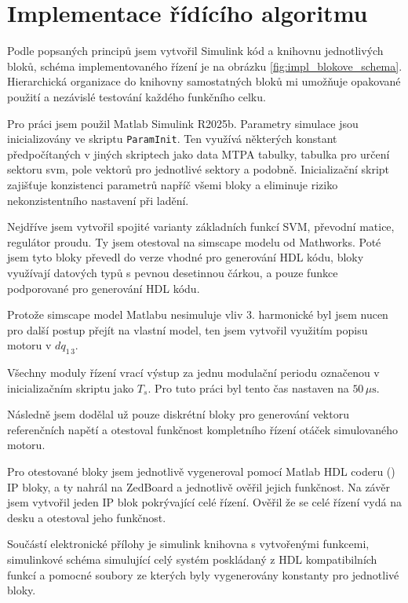 
\chapter{Implementace řídícího algoritmu}
Podle popsaných principů jsem vytvořil Simulink kód a knihovnu jednotlivých bloků, schéma implementovaného řízení je na obrázku \ref{fig:impl_blokove_schema}. Hierarchická organizace do knihovny samostatných bloků mi umožňuje opakované použití a nezávislé testování každého funkčního celku.



Pro práci jsem použil Matlab Simulink R2025b. Parametry simulace jsou inicializovány ve skriptu \texttt{ParamInit}. Ten využívá některých konstant předpočítaných v jiných skriptech jako  data MTPA tabulky, tabulka pro určení sektoru svm, pole vektorů pro jednotlivé sektory a podobně. Inicializační skript zajišťuje konzistenci parametrů napříč všemi bloky a eliminuje riziko nekonzistentního nastavení při ladění.

Nejdříve jsem vytvořil spojité varianty základních funkcí SVM, převodní matice, regulátor proudu. Ty jsem otestoval na simscape modelu od Mathworks.
Poté jsem tyto bloky převedl do verze vhodné pro generování HDL kódu, bloky využívají datových typů s pevnou desetinnou čárkou, a pouze funkce podporované pro generování HDL kódu.

Protože simscape model Matlabu nesimuluje vliv 3. harmonické byl jsem nucen pro další postup přejít na vlastní model, ten jsem vytvořil využitím popisu motoru v $dq_{1\,3}$.

Všechny moduly řízení vrací výstup za jednu modulační periodu označenou v inicializačním skriptu jako $T_s$. Pro tuto práci byl tento čas nastaven na $50\,\mu\text{s}$.

Následně jsem dodělal už pouze diskrétní bloky pro generování vektoru referenčních napětí a otestoval funkčnost kompletního řízení otáček simulovaného motoru.

Pro otestované bloky jsem jednotlivě vygeneroval pomocí Matlab HDL coderu (\cite{matlab}) IP bloky, a ty nahrál na ZedBoard a jednotlivě ověřil jejich funkčnost. Na závěr jsem vytvořil jeden IP blok pokrývající celé  řízení. Ověřil že se celé řízení vydá na desku a otestoval jeho funkčnost.

Součástí elektronické přílohy je simulink knihovna s vytvořenými funkcemi, simulinkové schéma simulující celý systém poskládaný z HDL kompatibilních funkcí a pomocné soubory ze kterých byly vygenerovány konstanty pro jednotlivé bloky.


